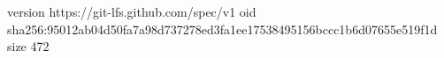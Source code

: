 version https://git-lfs.github.com/spec/v1
oid sha256:95012ab04d50fa7a98d737278ed3fa1ee17538495156bccc1b6d07655e519f1d
size 472
